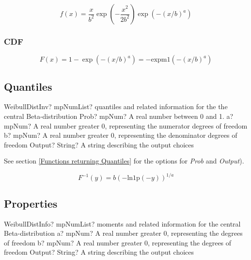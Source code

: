 \begin{equation} 
	f(x)= \frac{x}{b^2} \exp \left(- \frac{x^2}{2b^2}\right) \exp(-(x/b)^a)
\end{equation}


\subsubsection{CDF}

\begin{equation} 
	F(x)= 1 - \exp \left(- (x/b)^a\right)
	= -\text{expm1} \left(- (x/b)^a\right)
\end{equation}



\subsection{Quantiles}

\begin{mpFunctionsExtract}
	\mpFunctionFourNotImplemented
	{WeibullDistInv? mpNumList? quantiles and related information for the the central Beta-distribution}
	{Prob? mpNum? A real number between 0 and 1.}
	{a? mpNum? A real number greater 0, representing the numerator  degrees of freedom}
	{b? mpNum? A real number greater 0, representing the denominator degrees of freedom}
	{Output? String? A string describing the output choices}
\end{mpFunctionsExtract}

See section \ref{Functions returning Quantiles} for the options for  {\itshape\sffamily Prob} and {\itshape\sffamily Output}). 


\vspace{0.3cm}
\begin{equation} 
	F^{-1}(y)= b (- \text{ln1p}(-y))^{1/a}
\end{equation}



\subsection{Properties}


\begin{mpFunctionsExtract}
	\mpFunctionThreeNotImplemented
	{WeibullDistInfo? mpNumList? moments and related information for the central Beta-distribution}
	{a? mpNum? A real number greater 0, representing the degrees of freedom}
	{b? mpNum? A real number greater 0, representing the degrees of freedom}
	{Output? String? A string describing the output choices}
\end{mpFunctionsExtract}

